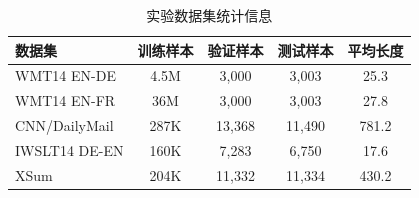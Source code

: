 \begin{table}[h]
\centering
\caption{实验数据集统计信息}
\label{tab:datasets}
{\renewcommand{\arraystretch}{0.65}
\begin{tabular}{|l|c|c|c|c|}
\hline
数据集 & 训练样本 & 验证样本 & 测试样本 & 平均长度 \\
\hline
WMT14 EN-DE & 4.5M & 3,000 & 3,003 & 25.3 \\
WMT14 EN-FR & 36M & 3,000 & 3,003 & 27.8 \\
CNN/DailyMail & 287K & 13,368 & 11,490 & 781.2 \\
IWSLT14 DE-EN & 160K & 7,283 & 6,750 & 17.6 \\
XSum & 204K & 11,332 & 11,334 & 430.2 \\
\hline
\end{tabular}}
\end{table}
